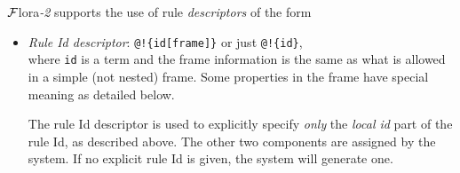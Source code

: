 \documentclass[11pt]{article}
\newcommand{\FLORA}{{\mbox{\sc ${\cal F}${lora}\rm\emph{-2}}}\xspace}
\newcommand{\FLSYSTEM}{\FLORA}
\begin{document}
\FLSYSTEM supports the use of rule \emph{descriptors} of the form
\begin{itemize}
\item  \emph{Rule Id descriptor}:   \texttt{@!\{id[frame]\}}  or just \texttt{@!\{id\}}, \\
  where \texttt{id} is a term and the frame information is the same as what
  is allowed in a simple (not nested) frame.
  Some properties in the frame have special meaning as detailed below.

  The rule Id descriptor is used to explicitly specify \emph{only}
  the \emph{local id}
  part of the rule Id, as described above. The other two components
  are assigned by the system. If no explicit rule Id is given, the system
  will generate one.


\end{itemize}
\end{document}
